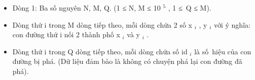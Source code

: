 \begin{itemize}
	\item     Dòng 1: Ba số nguyên N, M, Q. (1 ≤ N, M ≤ 10    $^     5    $    , 1 ≤ Q ≤ M).   
	\item     Dòng thứ i trong M dòng tiếp theo, mỗi dòng chứa 2 số x    $_     i    $    , y    $_     i    $    với ý nghĩa: con đường thứ i nối 2 thành phố x    $_     i    $    và y    $_     i    $    .   
	\item     Dòng thứ i trong Q dòng tiếp theo, mỗi dòng chứa số id    $_     i    $    là số hiệu của con đường bị phá. (Dữ liệu đảm bào là không có chuyện phá lại con đường đã phá).   
\end{itemize}